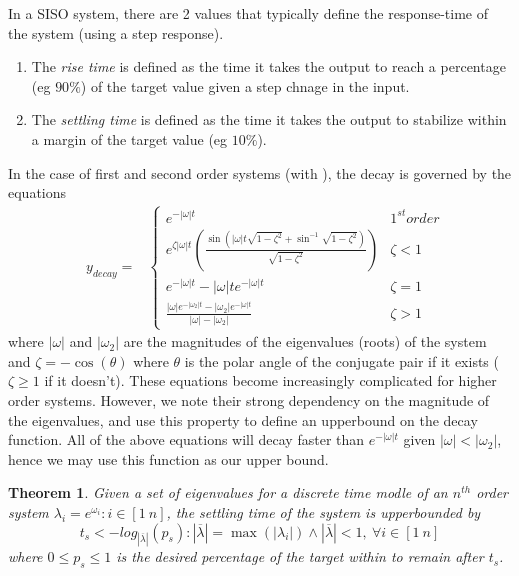 \documentclass[twocolumn]{autart}    %
\newtheorem{theorem}{Theorem}
\begin{document}
In a SISO system, there are 2 values that typically define the response-time of the system (using a step response).
\begin{enumerate}
\item The \emph{rise time} is defined as the time it takes the output to reach a percentage (eg $90\%$) of the target value given a step chnage in the input.
\item The \emph{settling time} is defined as the time it takes the output to stabilize within a margin of the target value (eg $10\%$).
\end{enumerate} 
In the case of first and second order systems (with ), the decay is governed by the equations 
\begin{align*}
&y_{decay}=
&\left\{
\begin{array}{cc}
e^{-|\omega| t}& 1^{st} order\\
e^{\zeta |\omega| t}\left(\frac{\sin\left(|\omega| t\sqrt{1-\zeta^2}+\sin^{-1}\sqrt{1-\zeta^2}\right)}{\sqrt{1-\zeta^2}} \right)&\zeta<1\\
e^{-|\omega| t}-|\omega| t e^{-|\omega| t}&\zeta=1\\
\frac{|\omega| e^{-|\omega_2| t}-|\omega_2| e^{-|\omega| t}}{|\omega|-|\omega_2|}&\zeta>1\end{array}\right.
\end{align*}
where $|\omega|$ and $|\omega_2|$ are the magnitudes of the eigenvalues (roots) of the system and  $\zeta=-\cos(\theta)$ where $\theta$ is the polar angle of the conjugate pair if it exists ($\zeta \geq 1$ if it doesn't).
These equations become increasingly complicated for higher order systems. However, we note their strong dependency on the magnitude of the eigenvalues, and use this property to define an upperbound on the decay function.
All of the above equations will decay faster than $e^{-|\omega| t}$ given $|\omega| < |\omega_2|$, hence we may use this function as our upper bound.
\begin{theorem}
Given a set of eigenvalues for a discrete time modle of an $n^{th}$ order system $\lambda_i =e^{\omega_i}: i \in [1\ n]$, the settling time of the system is upperbounded by
\begin{equation}
t_s<-log_{|\overline{\lambda}|}({p_s}) : |\overline{\lambda}| =\max(|\lambda_i|) \wedge |\overline{\lambda}|<1,\ \forall i \in [1\ n]
\label{eq:set_time}
\end{equation}
where $0\leq p_s \leq 1$ is the desired percentage of the target within to remain after $t_s$.
\end{theorem} 
\end{document}
